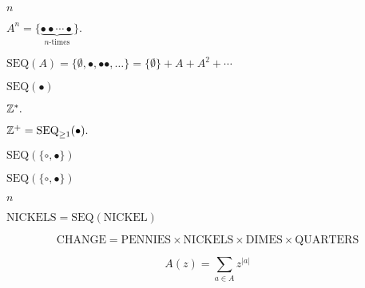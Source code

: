 \documentclass[10pt]{book}
\begin{document}
\begin{mdSnippets}
\begin{mdInlineSnippet}[7b8b965ad4bca0e41ab51de7b31363a1]
$n$\end{mdInlineSnippet}%
\begin{mdInlineSnippet}[2e07a12773ece05d1e72f5791c9df5fd]%
$A^n=\{\underbrace{\bullet\bullet\cdots\bullet}_{n\text{-times}}\}.$\end{mdInlineSnippet}%
\begin{mdInlineSnippet}[5f370b3fac78f15ab6c6e8eb8398b18d]%
$\text{SEQ}(A)=\{\emptyset, \bullet, \bullet\bullet,\ldots\}=\{\emptyset\}+A+A^2+\cdots$\end{mdInlineSnippet}%
\begin{mdInlineSnippet}[b71d01ee76c1a1775617d5b83685f37f]%
$\text{SEQ}(\bullet)$\end{mdInlineSnippet}%
\begin{mdInlineSnippet}[8c6329bf24760e3874d8f5a743a02d89]%
$\mathbb{Z}^*.$\end{mdInlineSnippet}%
\begin{mdInlineSnippet}[0eda32425259314f7bc4737294909a36]%
$\mathbb{Z}^+=\text{SEQ}_{\geq1}(\bullet).$\end{mdInlineSnippet}%
\begin{mdInlineSnippet}[ddd41e94ba159ad6f698b9982201dd33]%
$\text{SEQ}(\{\circ,\bullet\})$\end{mdInlineSnippet}%
\begin{mdInlineSnippet}[ddd41e94ba159ad6f698b9982201dd33]%
$\text{SEQ}(\{\circ,\bullet\})$\end{mdInlineSnippet}%
\begin{mdInlineSnippet}[7b8b965ad4bca0e41ab51de7b31363a1]%
$n$\end{mdInlineSnippet}%
\begin{mdInlineSnippet}[c2dd5a1a6afb5f3e69576737e192215e]%
$\text{NICKELS} = \text{SEQ}(\text{NICKEL})$\end{mdInlineSnippet}%
\begin{mdDisplaySnippet}[9d316fd89176a19114c12915c75a078f]%
\[%
\text{CHANGE} = \text{PENNIES}\times\text{NICKELS}\times\text{DIMES}\times\text{QUARTERS}
\]%
\end{mdDisplaySnippet}%
\begin{mdDisplaySnippet}[de189626c0f468f00af26235752660a7]%
\[%
A(z)=\sum_{a\in A}z^{|a|}
\]%
\end{mdDisplaySnippet}%

\end{mdSnippets}
\end{document}
